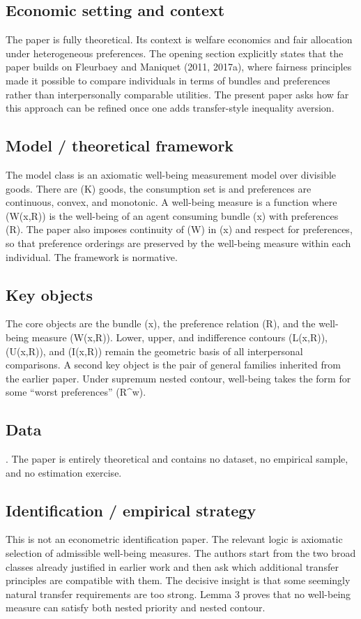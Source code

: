 \documentclass[11pt,a4paper]{article}
\begin{document}
\subsection*{Economic setting and context}
The paper is fully theoretical. Its context is welfare economics and fair allocation under heterogeneous preferences. The opening section explicitly states that the paper builds on Fleurbaey and Maniquet (2011, 2017a), where fairness principles made it possible to compare individuals in terms of bundles and preferences rather than interpersonally comparable utilities. The present paper asks how far this approach can be refined once one adds transfer-style inequality aversion.

\subsection*{Model / theoretical framework}
The model class is an axiomatic well-being measurement model over divisible goods. There are (K) goods, the consumption set is and preferences are continuous, convex, and monotonic. A well-being measure is a function where (W(x,R)) is the well-being of an agent consuming bundle (x) with preferences (R). The paper also imposes continuity of (W) in (x) and respect for preferences, so that preference orderings are preserved by the well-being measure within each individual. The framework is normative.

\subsection*{Key objects}
The core objects are the bundle (x), the preference relation (R), and the well-being measure (W(x,R)). Lower, upper, and indifference contours (L(x,R)), (U(x,R)), and (I(x,R)) remain the geometric basis of all interpersonal comparisons. A second key object is the pair of general families inherited from the earlier paper. Under supremum nested contour, well-being takes the form for some “worst preferences” (R\textasciicircum{}w).

\subsection*{Data}
. The paper is entirely theoretical and contains no dataset, no empirical sample, and no estimation exercise.

\subsection*{Identification / empirical strategy}
This is not an econometric identification paper. The relevant logic is axiomatic selection of admissible well-being measures. The authors start from the two broad classes already justified in earlier work and then ask which additional transfer principles are compatible with them. The decisive insight is that some seemingly natural transfer requirements are too strong. Lemma 3 proves that no well-being measure can satisfy both nested priority and nested contour.
\end{document}
